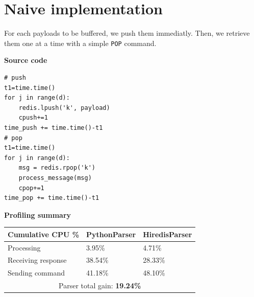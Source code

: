 \documentclass[a4paper, 11pt]{report}
\begin{document}
\newpage
\section{Naive implementation\label{sec:naive}}
For each payloads to be buffered, we push them immediatly. Then, we retrieve them one at a time with a simple \texttt{POP} command.\\

\begin{minipage}[t]{0.45\textwidth}
\textbf{Source code}\\
\vspace{-0.5em}
\begin{lstlisting}
# push
t1=time.time()
for j in range(d):
    redis.lpush('k', payload)
    cpush+=1
time_push += time.time()-t1
# pop
t1=time.time()
for j in range(d):
    msg = redis.rpop('k')
    process_message(msg)
    cpop+=1
time_pop += time.time()-t1
\end{lstlisting}
\end{minipage}
\quad
\begin{minipage}[t]{0.5\textwidth}
\textbf{Profiling summary}\\

    \begin{tabular}{|l|l|l|}
        \hline
        Cumulative CPU \% & PythonParser & HiredisParser\\
        \hline
        Processing & 3.95\% & 4.71\%\\
        \hline
        Receiving response & 38.54\% & 28.33\%\\
        \hline
        Sending command & 41.18\% & 48.10\%\\
        \hline
        \multicolumn{3}{|c|}{Parser total gain: \textbf{19.24\%}}\\
        \hline
    \end{tabular}
\end{minipage}
\end{document}
